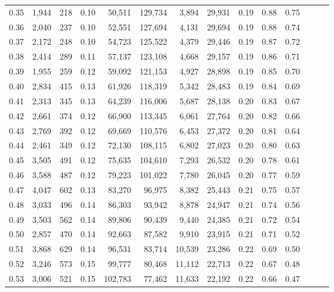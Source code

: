 \begin{tabular}{rrrrrrrrrrrrrr}
0.35 &  1,944 &  218 &  0.10 &   50,511 &  129,734 &   3,894 &  29,931 &  0.19 &  0.88 &      0.75 \\
0.36 &  2,040 &  237 &  0.10 &   52,551 &  127,694 &   4,131 &  29,694 &  0.19 &  0.88 &      0.74 \\
0.37 &  2,172 &  248 &  0.10 &   54,723 &  125,522 &   4,379 &  29,446 &  0.19 &  0.87 &      0.72 \\
0.38 &  2,414 &  289 &  0.11 &   57,137 &  123,108 &   4,668 &  29,157 &  0.19 &  0.86 &      0.71 \\
0.39 &  1,955 &  259 &  0.12 &   59,092 &  121,153 &   4,927 &  28,898 &  0.19 &  0.85 &      0.70 \\
0.40 &  2,834 &  415 &  0.13 &   61,926 &  118,319 &   5,342 &  28,483 &  0.19 &  0.84 &      0.69 \\
0.41 &  2,313 &  345 &  0.13 &   64,239 &  116,006 &   5,687 &  28,138 &  0.20 &  0.83 &      0.67 \\
0.42 &  2,661 &  374 &  0.12 &   66,900 &  113,345 &   6,061 &  27,764 &  0.20 &  0.82 &      0.66 \\
0.43 &  2,769 &  392 &  0.12 &   69,669 &  110,576 &   6,453 &  27,372 &  0.20 &  0.81 &      0.64 \\
0.44 &  2,461 &  349 &  0.12 &   72,130 &  108,115 &   6,802 &  27,023 &  0.20 &  0.80 &      0.63 \\
0.45 &  3,505 &  491 &  0.12 &   75,635 &  104,610 &   7,293 &  26,532 &  0.20 &  0.78 &      0.61 \\
0.46 &  3,588 &  487 &  0.12 &   79,223 &  101,022 &   7,780 &  26,045 &  0.20 &  0.77 &      0.59 \\
0.47 &  4,047 &  602 &  0.13 &   83,270 &   96,975 &   8,382 &  25,443 &  0.21 &  0.75 &      0.57 \\
0.48 &  3,033 &  496 &  0.14 &   86,303 &   93,942 &   8,878 &  24,947 &  0.21 &  0.74 &      0.56 \\
0.49 &  3,503 &  562 &  0.14 &   89,806 &   90,439 &   9,440 &  24,385 &  0.21 &  0.72 &      0.54 \\
0.50 &  2,857 &  470 &  0.14 &   92,663 &   87,582 &   9,910 &  23,915 &  0.21 &  0.71 &      0.52 \\
0.51 &  3,868 &  629 &  0.14 &   96,531 &   83,714 &  10,539 &  23,286 &  0.22 &  0.69 &      0.50 \\
0.52 &  3,246 &  573 &  0.15 &   99,777 &   80,468 &  11,112 &  22,713 &  0.22 &  0.67 &      0.48 \\
0.53 &  3,006 &  521 &  0.15 &  102,783 &   77,462 &  11,633 &  22,192 &  0.22 &  0.66 &      0.47 \\

\end{tabular}
